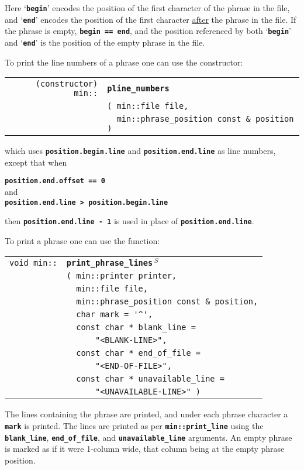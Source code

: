 \documentclass[12pt]{article}
\makeatletter
\newcommand{\TT}[1]{{\tt \bfseries #1}}
\newcommand{\ttindex}[1]{\index{#1@{\tt #1}}}
\newcommand{\EOL}{\penalty \exhyphenpenalty}
\newenvironment{indpar}[1][0.3in]%
	{\begin{list}{}%
		     {\setlength{\itemsep}{0in}%
		      \setlength{\topsep}{0in}%
		      \setlength{\parsep}{1ex}%
		      \setlength{\labelwidth}{#1}%
		      \setlength{\leftmargin}{#1}%
		      \addtolength{\leftmargin}{\labelsep}}%
	 \item}%
	{\end{list}}
\newcommand{\LABEL}[1]{\label{#1}}
\newlength{\ARGBREAKLENGTH}
\newcommand{\ARGBREAK}[1][\ARGBREAKLENGTH]{\\&\hspace*{#1}}
\newcommand{\MINKEY}[1]%
	   {\TT{#1}\ttindex{min::#1}\ttindex{#1}}
\newcommand{\RESIZE}{$\,^S$}
\makeatother
\begin{document}
Here `\TT{begin}' encodes the position of the first character
of the phrase in the file, and `\TT{end}' encodes the position
of the first character \underline{after} the phrase in the file.
If the phrase is empty, \TT{begin == end}, and the position
referenced by both `\TT{begin}' and `\TT{end}'
is the position of the empty phrase in the file.

To print the line numbers of a phrase one can use the constructor:

\begin{indpar}[1em]\begin{tabular}{r@{}l}
\verb|(constructor) min::| & \MINKEY{pline\_numbers}\ARGBREAK
    \verb|( min::file file,|\ARGBREAK
    \verb|  min::phrase_position const & position )|
\LABEL{MIN::PLINE_NUMBERS_OF_PHRASE_POSITION} \\
\end{tabular}\end{indpar}

which uses \TT{position.begin.line} and
\TT{position.end.line} as
line numbers, except that when
\begin{center}
\TT{position.end.offset == 0} \\
and \\
\TT{position.end.line > position.begin.line}
\end{center}
then \TT{position.end.line - 1} is used in place of
\TT{position.end.line}.

To print a phrase one can use the function:

\begin{indpar}[1em]\begin{tabular}{r@{}l}
\verb|void min::|
    & \MINKEY{print\_\EOL phrase\_\EOL lines\RESIZE}\ARGBREAK
      \verb|( min::printer printer,|\ARGBREAK
      \verb|  min::file file,|\ARGBREAK
      \verb|  min::phrase_position const & position,|\ARGBREAK
      \verb|  char mark = '^',|\ARGBREAK
      \verb|  const char * blank_line =|\ARGBREAK
      \verb|      "<BLANK-LINE>",|\ARGBREAK
      \verb|  const char * end_of_file =|\ARGBREAK
      \verb|      "<END-OF-FILE>",|\ARGBREAK
      \verb|  const char * unavailable_line =|\ARGBREAK
      \verb|      "<UNAVAILABLE-LINE>" )|
\LABEL{MIN::PRINT_PHRASE_LINES} \\
\end{tabular}\end{indpar}

The lines containing the phrase are printed, and under each phrase
character a \TT{mark} is printed.  The lines are printed
as per \TT{min::\EOL print\_\EOL line} using the
\TT{blank\_\EOL line},
\TT{end\_\EOL of\_\EOL file}, and
\TT{unavailable\_\EOL line} arguments.
An empty phrase is marked as if it were 1-column wide, that column
being at the empty phrase position.
\end{document}
